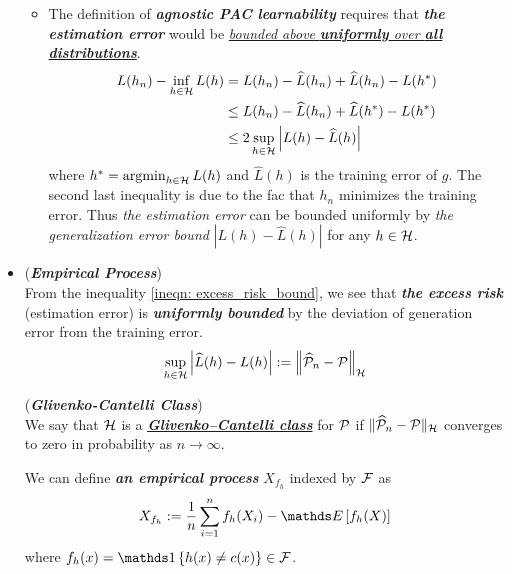 \documentclass[11pt]{article}
\begin{document}
\begin{itemize}
\begin{remark}
\begin{itemize}
\item The definition of \emph{\textbf{agnostic PAC learnability}} requires that \emph{\textbf{the estimation error}} would be \underline{\emph{bounded above} \emph{\textbf{uniformly} over \textbf{all distributions}}}.
\begin{align}
L(h_n) - \inf_{h \in {\mathcal H}}L(h) &= L(h_n) - \widehat{L}(h_n) + \widehat{L}(h_n) - L(h^{*}) \nonumber\\
&\le  L(h_n) - \widehat{L}(h_n) +\widehat{L}(h^{*}) - L(h^{*}) \nonumber\\
&\le  2 \sup_{h\in {\mathcal H}}\left\lvert L(h) - \widehat{L}(h) \right\rvert \label{ineqn: excess_risk_bound}
\end{align} where $h^{*} = \operatorname{argmin}_{h\in {\mathcal H}}L(h)$ and $\widehat{L}(h)$ is the training error of $g$. The second last inequality is due to the fac that $h_n$ minimizes the training error.  Thus \emph{the estimation error} can be bounded uniformly by \emph{the generalization error bound} $|L(h) - \widehat{L}(h)|$ for any $h \in {\mathcal H}$.
\end{itemize}
\end{remark} 

\item \begin{remark} (\textbf{\emph{Empirical Process}}) \\
From the inequality \eqref{ineqn: excess_risk_bound}, we see that \emph{\textbf{the excess risk}} (estimation error) is \emph{\textbf{uniformly bounded}} by the deviation of generation error from the training error.
\begin{align*}
\sup_{h\in {\mathcal H}}\left\lvert \widehat{L}(h) - L(h) \right\rvert := \left\|\widehat{{\mathcal P}}_n - {\mathcal P}\right\|_{{\mathcal H}}
\end{align*}
\begin{definition} (\textbf{\emph{Glivenko-Cantelli Class}}) \citep{wainwright2019high, gine2021mathematical}\\
We say that ${\mathcal H}$ is a \underline{\textit{\textbf{Glivenko–Cantelli class}}} for ${\mathcal P}$ if $\|\widehat{{\mathcal P}}_n - {\mathcal P}\|_{{\mathcal H}}$ converges to zero in probability as $n \to \infty$.
\end{definition}
We can define \emph{\textbf{an empirical process}} $X_{f_h}$ indexed by ${\mathcal F}$ as
\begin{align*}
X_{f_h} := \frac{1}{n}\sum_{i=1}^{n}f_h(X_i) - \E{}{f_h(X)}
\end{align*} where $f_h(x) = \ind{h(x) \neq c(x)} \in \cF$.
\end{remark}

\end{itemize}
\end{document}

